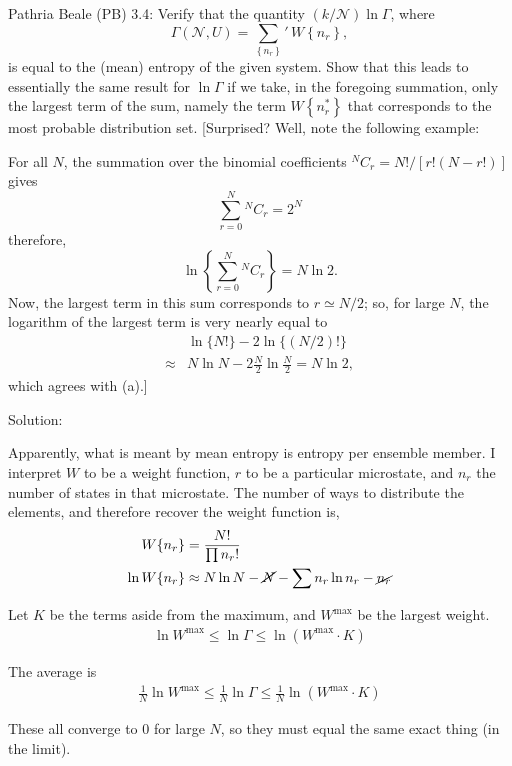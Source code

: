 \newpage
\begin{homeworkProblem}
    Pathria Beale (PB) 3.4: Verify that the quantity $(k / \mathcal{N}) \ln \Gamma$, where
$$
\Gamma(\mathcal{N}, U)=\sum_{\left\{n_r\right\}}{}'\, W\left\{n_r\right\},
$$
is equal to the (mean) entropy of the given system. Show that this leads to essentially the same result for $\ln \Gamma$ if we take, in the foregoing summation, only the largest term of the sum, namely the term $W\left\{n_r^*\right\}$ that corresponds to the most probable distribution set.
[Surprised? Well, note the following example:

For all $N$, the summation over the binomial coefficients ${ }^N C_r=N!/[r!(N-r!)]$ gives
$$
\sum_{r=0}^N{ }^N C_r=2^N
$$
therefore,
\begin{equation*}
\ln \left\{\sum_{r=0}^N{ }^N C_r\right\}=N \ln 2 . \tag{a}
\end{equation*}
Now, the largest term in this sum corresponds to $r \simeq N / 2$; so, for large $N$, the logarithm of the largest term is very nearly equal to
\begin{align*}
& \ln \{N!\}-2 \ln \{(N / 2)!\} \\
\approx & N \ln N-2 \frac{N}{2} \ln \frac{N}{2}=N \ln 2, \tag{b}
\end{align*}
which agrees with (a).]
\begin{callout}{Solution:}

Apparently, what is meant by mean entropy is entropy per ensemble member. I interpret $W$ to be a weight function, $r$ to be a particular microstate, and $n_r$ the number of states in that microstate. The number of ways to distribute the elements, and therefore recover the weight function is,
\begin{align*}
    W\{n_r\} &= \frac{N!}{\prod n_r!} \\ 
    \ln W\{n_r\} &\approx N\ln N - \cancel{N} - \sum n_r \ln n_r - \cancel{n_r} 
\end{align*}

Let $K$ be the terms aside from the maximum, and $W^\text{max}$ be the largest weight.
\begin{align*}
    \ln W^{\text{max}} \leq
    \ln \Gamma \leq
    \ln \left( W^{\text{max}}\cdot K \right)
\end{align*}

The average is 
\begin{align*}
    \frac{1}{N}\ln W^{\text{max}} \leq
    \frac{1}{N}\ln \Gamma \leq
    \frac{1}{N}\ln \left( W^{\text{max}}\cdot K \right)
\end{align*}

These all converge to 0 for large $N$, so they must equal the same exact thing (in the limit).


\end{callout}

\end{homeworkProblem}

